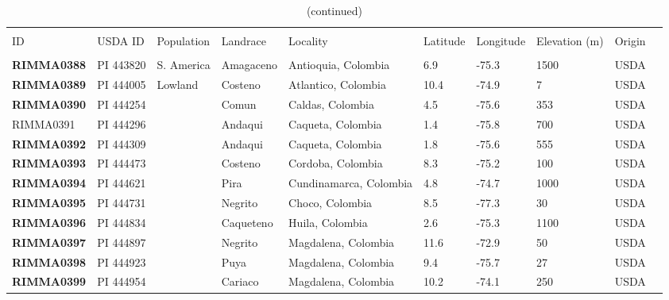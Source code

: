 \begin{table}[h]
\begin{center}
\end{center} 

\end{table}

\clearpage

\setcounter{table}{0}
\renewcommand{\arraystretch}{1.2}

\begin{table}[h]
    \begin{center}
    \caption[]{(continued)\hspace*{13.5cm}}  
{\fontsize{7}{10}\selectfont
    \begin{tabular}{llllllllll}
        \hline\hline
       & & & \\[-4mm] 
	 ID	&	USDA ID	&	Population	&	Landrace	&	Locality	&	Latitude	&	Longitude	&	Elevation (m)	&	Origin	\\[0.0cm]
	\hline 
	& & & \\[-4mm] 
{\bf RIMMA0388}	&	PI 443820	&	S. America	&	Amagaceno	&	Antioquia, Colombia	&	6.9 	&	-75.3 	&	1500	&	USDA	\\
{\bf RIMMA0389}	&	PI 444005	&	Lowland	&	Costeno	&	Atlantico, Colombia	&	10.4 	&	-74.9 	&	7	&	USDA	\\
{\bf RIMMA0390}	&	PI 444254	&		&	Comun	&	Caldas, Colombia	&	4.5 	&	-75.6 	&	353	&	USDA	\\
RIMMA0391	&	PI 444296	&		&	Andaqui	&	Caqueta, Colombia	&	1.4 	&	-75.8 	&	700	&	USDA	\\
{\bf RIMMA0392}	&	PI 444309	&		&	Andaqui	&	Caqueta, Colombia	&	1.8 	&	-75.6 	&	555	&	USDA	\\
{\bf RIMMA0393}	&	PI 444473	&		&	Costeno	&	Cordoba, Colombia	&	8.3 	&	-75.2 	&	100	&	USDA	\\
{\bf RIMMA0394}	&	PI 444621	&		&	Pira	&	Cundinamarca, Colombia	&	4.8 	&	-74.7 	&	1000	&	USDA	\\
{\bf RIMMA0395}	&	PI 444731	&		&	Negrito	&	Choco, Colombia	&	8.5 	&	-77.3 	&	30	&	USDA	\\
{\bf RIMMA0396}	&	PI 444834	&		&	Caqueteno	&	Huila, Colombia	&	2.6 	&	-75.3 	&	1100	&	USDA	\\
{\bf RIMMA0397}	&	PI 444897	&		&	Negrito	&	Magdalena, Colombia	&	11.6 	&	-72.9 	&	50	&	USDA	\\
{\bf RIMMA0398}	&	PI 444923	&		&	Puya	&	Magdalena, Colombia	&	9.4 	&	-75.7 	&	27	&	USDA	\\
{\bf RIMMA0399}	&	PI 444954	&		&	Cariaco	&	Magdalena, Colombia	&	10.2 	&	-74.1 	&	250	&	USDA	\\

\end{tabular}}
\end{center}
\end{table}
